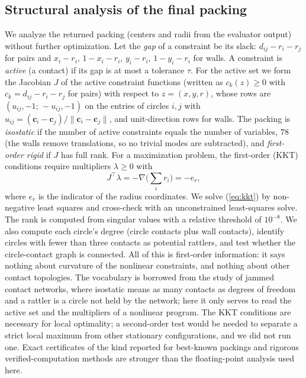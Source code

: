 \documentclass{article} %
\begin{document}
\subsection{Structural analysis of the final packing}\label{sec:struct}
We analyze the returned packing (centers and radii from the evaluator output) without further optimization. Let the \emph{gap} of a constraint be its slack: $d_{ij}-r_i-r_j$ for pairs and $x_i-r_i$, $1-x_i-r_i$, $y_i-r_i$, $1-y_i-r_i$ for walls. A constraint is \emph{active} (a contact) if its gap is at most a tolerance $\tau$. For the active set we form the Jacobian $J$ of the active constraint functions (written as $c_k(z)\ge 0$ with $c_k=d_{ij}-r_i-r_j$ for pairs) with respect to $z=(x,y,r)$, whose rows are $(u_{ij},-1;\,-u_{ij},-1)$ on the entries of circles $i,j$ with $u_{ij}=(\mathbf{c}_i-\mathbf{c}_j)/\|\mathbf{c}_i-\mathbf{c}_j\|$, and unit-direction rows for walls. The packing is \emph{isostatic} if the number of active constraints equals the number of variables, $78$ (the walls remove translations, so no trivial modes are subtracted), and \emph{first-order rigid} if $J$ has full rank. For a maximization problem, the first-order (KKT) conditions require multipliers $\lambda\ge 0$ with
\begin{equation}
J^{\top}\lambda=-\nabla\Big(\sum_i r_i\Big)=-e_r,\label{eq:kkt}
\end{equation}
where $e_r$ is the indicator of the radius coordinates. We solve (\ref{eq:kkt}) by non-negative least squares and cross-check with an unconstrained least-squares solve. The rank is computed from singular values with a relative threshold of $10^{-8}$. We also compute each circle's degree (circle contacts plus wall contacts), identify circles with fewer than three contacts as potential rattlers, and test whether the circle-contact graph is connected. All of this is first-order information: it says nothing about curvature of the nonlinear constraints, and nothing about other contact topologies.
The vocabulary is borrowed from the study of jammed contact networks, where isostatic means as many contacts as degrees of freedom and a rattler is a circle not held by the network; here it only serves to read the active set and the multipliers of a nonlinear program. The KKT conditions are necessary for local optimality; a second-order test would be needed to separate a strict local maximum from other stationary configurations, and we did not run one. Exact certificates of the kind reported for best-known packings \citep{MokiJulio2026Moki} and rigorous verified-computation methods \citep{Montanher2018Rigorous} are stronger than the floating-point analysis used here.
\end{document}
